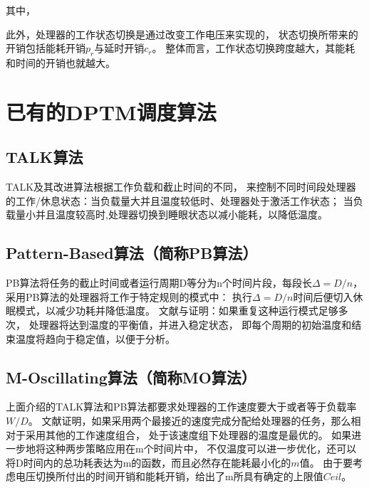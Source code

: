 其中，

此外，处理器的工作状态切换是通过改变工作电压来实现的， 状态切换所带来的开销包括能耗开销$p_r$与延时开销$c_r$。 整体而言，工作状态切换跨度越大，其能耗和时间的开销也就越大。


\section{已有的DPTM调度算法}
\label{algorithms}

\subsection{TALK算法}
TALK及其改进算法根据工作负载和截止时间的不同， 来控制不同时间段处理器的工作/休息状态：当负载量大并且温度较低时、处理器处于激活工作状态； 当负载量小并且温度较高时,处理器切换到睡眼状态以减小能耗，以降低温度。


\subsection{Pattern-Based算法（简称PB算法）}

PB算法将任务的截止时间或者运行周期D等分为n个时间片段，每段长$\Delta=D/n$， 采用PB算法的处理器将工作于特定规则的模式中： 执行$\Delta=D/n$时间后便切入休眠模式，以减少功耗并降低温度。 文献与证明：如果重复这种运行模式足够多次， 处理器将达到温度的平衡值，并进入稳定状态， 即每个周期的初始温度和结束温度将趋向于稳定值，以便于分析。

\subsection{M-Oscillating算法（简称MO算法）}

上面介绍的TALK算法和PB算法都要求处理器的工作速度要大于或者等于负载率$W/D$。 文献证明，如果采用两个最接近的速度完成分配给处理器的任务，那么相对于采用其他的工作速度组合， 处于该速度组下处理器的温度是最优的。 如果进一步地将这种两步策略应用在m个时间片中， 不仅温度可以进一步优化，还可以将D时间内的总功耗表达为m的函数，而且必然存在能耗最小化的$m$值。 由于要考虑电压切换所付出的时间开销和能耗开销，给出了m所具有确定的上限值$Ceil$。

